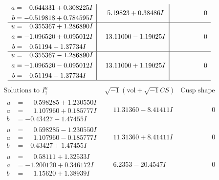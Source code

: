 \documentclass[1p]{elsarticle_modified}
\theoremstyle{definition}
\newcommand{\I}{\sqrt{-1}}
\begin{document}
$$\begin{array}{c|c|c}
\begin{aligned}
a &= \phantom{-}0.644331 + 0.308225 I \\
b &= -0.519818 + 0.784595 I\end{aligned}
 & \phantom{-}5.19823 + 0.38486 I & \phantom{-0.000000 } 0 \\ \hline\begin{aligned}
u &= \phantom{-}0.355367 + 1.286890 I \\
a &= -1.096520 + 0.095012 I \\
b &= \phantom{-}0.51194 + 1.37734 I\end{aligned}
 & \phantom{-}13.11000 - 1.19025 I & \phantom{-0.000000 } 0 \\ \hline\begin{aligned}
u &= \phantom{-}0.355367 - 1.286890 I \\
a &= -1.096520 - 0.095012 I \\
b &= \phantom{-}0.51194 - 1.37734 I\end{aligned}
 & \phantom{-}13.11000 + 1.19025 I & \phantom{-0.000000 } 0\\
 \hline 
 \end{array}$$\newpage$$\begin{array}{c|c|c}  
\text{Solutions to }I^u_{1}& \I (\text{vol} + \sqrt{-1}CS) & \text{Cusp shape}\\
 \hline 
\begin{aligned}
u &= \phantom{-}0.598285 + 1.230550 I \\
a &= \phantom{-}1.107960 + 0.185777 I \\
b &= -0.43427 - 1.47455 I\end{aligned}
 & \phantom{-}11.31360 - 8.41411 I & \phantom{-0.000000 } 0 \\ \hline\begin{aligned}
u &= \phantom{-}0.598285 - 1.230550 I \\
a &= \phantom{-}1.107960 - 0.185777 I \\
b &= -0.43427 + 1.47455 I\end{aligned}
 & \phantom{-}11.31360 + 8.41411 I & \phantom{-0.000000 } 0 \\ \hline\begin{aligned}
u &= \phantom{-}0.58111 + 1.32533 I \\
a &= -1.200120 + 0.346172 I \\
b &= \phantom{-}1.15620 + 1.38939 I\end{aligned}
 & \phantom{-}6.2353 - 20.4547 I & \phantom{-0.000000 } 0 \\ \hline\begin{aligned}

\end{aligned}
\end{array}$$
\end{document}
